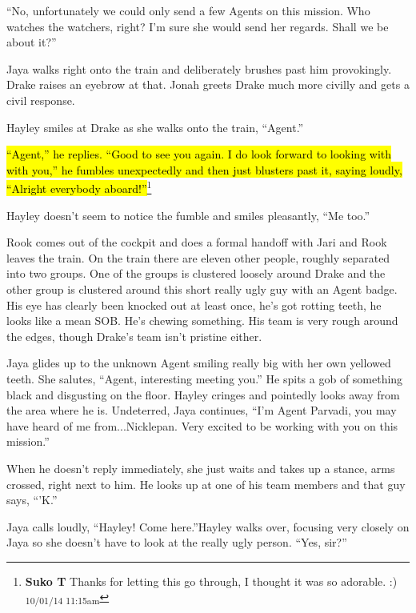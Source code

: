 ``No, unfortunately we could only send a few Agents on this mission.  Who watches the watchers, right?  I'm sure she would send her regards.  Shall we be about it?''

Jaya walks right onto the train and deliberately brushes past him provokingly.  Drake raises an eyebrow at that.  Jonah greets Drake much more civilly and gets a civil response.

Hayley smiles at Drake as she walks onto the train, ``Agent.''

\hl{``Agent,'' he replies.  ``Good to see you again. I do look forward to looking with with you,'' he fumbles unexpectedly and then just blusters past it, saying loudly, ``Alright everybody aboard!''}\footnote{\textbf{Suko T }Thanks for letting this go through, I thought it was so adorable. :) \textsubscript{10/01/14 11:15am}}

Hayley doesn't seem to notice the fumble and smiles pleasantly, ``Me too.''





Rook comes out of the cockpit and does a formal handoff with Jari and Rook leaves the train.  On the train there are eleven other people, roughly separated into two groups.  One of the groups is clustered loosely around Drake and the other group is clustered around this short really ugly guy with an Agent badge.  His eye has clearly been knocked out at least once, he's got rotting teeth, he looks like a mean SOB.   He's chewing something.  His team is very rough around the edges, though Drake's team isn't pristine either.



Jaya glides up to the unknown Agent smiling really big with her own yellowed teeth.  She salutes, ``Agent, interesting meeting you.''  He spits a gob of something black and disgusting on the floor.  Hayley cringes and pointedly looks away from the area where he is.  Undeterred, Jaya continues, ``I'm Agent Parvadi, you may have heard of me from...Nicklepan.  Very excited to be working with you on this mission.''

When he doesn't reply immediately, she just waits and takes up a stance, arms crossed, right next to him.  He looks up at one of his team members and that guy says, ``'K.''

Jaya calls loudly, ``Hayley!  Come here.''Hayley walks over, focusing very closely on Jaya so she doesn't have to look at the really ugly person.  ``Yes, sir?''

